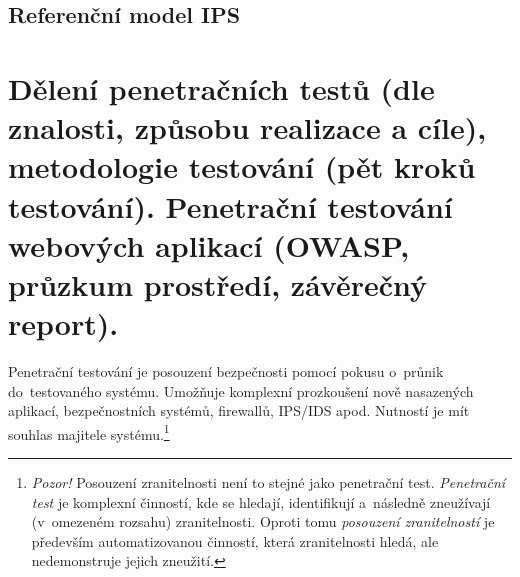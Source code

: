 \subsection{Referenční model IPS}

\begin{figure}[ht]
    \centering
\end{figure}

\clearpage

\section{Dělení penetračních testů (dle znalosti, způsobu realizace a cíle), metodologie testování (pět kroků testování). Penetrační testování webových aplikací (OWASP, průzkum prostředí, závěrečný report).}

Penetrační testování je posouzení bezpečnosti pomocí pokusu o~průnik do~testovaného systému. Umožňuje komplexní prozkoušení nově nasazených aplikací, bezpečnostních systémů, firewallů, IPS/IDS apod. Nutností je mít souhlas majitele systému.\footnote{\textit{Pozor!} Posouzení zranitelnosti není to stejné jako penetrační test. \textit{Penetrační test} je komplexní činností, kde se hledají, identifikují a~následně zneužívají (v~omezeném rozsahu) zranitelnosti. Oproti tomu \textit{posouzení zranitelností} je především automatizovanou činností, která zranitelnosti hledá, ale nedemonstruje jejich zneužití.}

